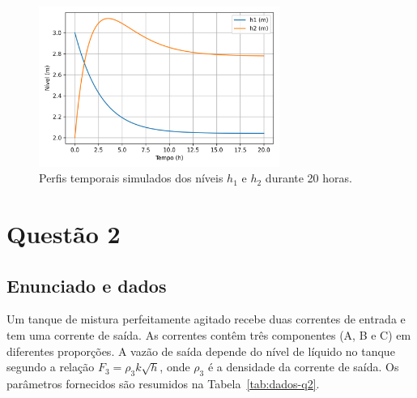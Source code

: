 \documentclass{article}
\begin{document}


\begin{figure}[ht]
  \centering
  \includegraphics[width=0.7\textwidth]{figuras/questao1_niveis.png}
  \caption{Perfis temporais simulados dos níveis $h_1$ e $h_2$ durante 20 horas.}
  \label{fig:questao1}
\end{figure}

\section{Questão 2}

\subsection*{Enunciado e dados}
Um tanque de mistura perfeitamente agitado recebe duas correntes de entrada e tem uma corrente de saída. As correntes contêm três componentes (A, B e C) em diferentes proporções. A vazão de saída depende do nível de líquido no tanque segundo a relação $F_3 = \rho_3 k\sqrt{h}$, onde $\rho_3$ é a densidade da corrente de saída. Os parâmetros fornecidos são resumidos na Tabela~\ref{tab:dados-q2}.
\end{document}
